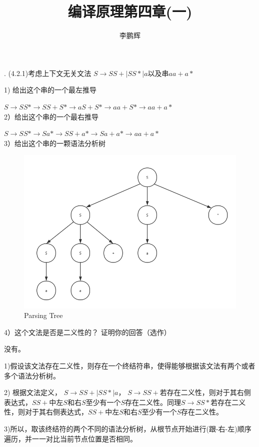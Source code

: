 \documentclass[a4paper, 16pt]{article}
\title{编译原理第四章(一)}
\author{李鹏辉}
\begin{document}
. (4.2.1)考虑上下文无关文法 $S \rightarrow SS + | S S * | a$以及串$aa+a*$

1) 给出这个串的一个最左推导

$S \rightarrow SS* \rightarrow SS+S* \rightarrow aS+S* \rightarrow aa+S* \rightarrow aa+a*$\\

2）给出这个串的一个最右推导

$S \rightarrow SS* \rightarrow Sa* \rightarrow SS+a* \rightarrow Sa+a* \rightarrow aa+a* $\\

3）给出这个串的一颗语法分析树\\
\begin{figure}[H]
\centering
\includegraphics[scale = 0.4]{chapter4_hw1_1}
\caption{Parsing Tree}
\end{figure}

4）这个文法是否是二义性的？ 证明你的回答（选作）

没有。

1)假设该文法存在二义性，则存在一个终结符串，使得能够根据该文法有两个或者多个语法分析树。

2) 根据文法定义， $S \rightarrow SS + | S S * | a$， $ S \rightarrow SS+$若存在二义性，则对于其右侧表达式，$SS+$中左$S$和右$S$至少有一个$S$存在二义性。同理$ S \rightarrow SS*$若存在二义性，则对于其右侧表达式，$SS+$中左$S$和右$S$至少有一个$S$存在二义性。

3)所以，取该终结符的两个不同的语法分析树，从根节点开始进行(跟-右-左)顺序遍历，并一一对比当前节点位置是否相同。
\end{document}
